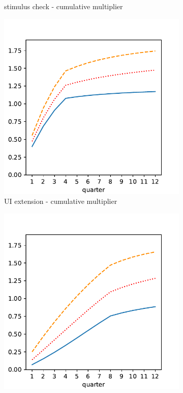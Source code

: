 \begin{figure}[htb]
\begin{subfigure}[b]{.33\linewidth}
		\caption{stimulus check - cumulative multiplier}
		\label{fig:HANK_transfer_multiplier}
	\end{subfigure}%
	\begin{subfigure}[b]{.33\linewidth}
		\centering
		\includegraphics[width=\linewidth]{text/chapter3/Code/HA-Models/FromPandemicCode/Figures/HANK_UI_multiplier}
		\caption{UI extension - cumulative multiplier}
		\label{fig:HANK_UI_multiplier}
	\end{subfigure}%
	\begin{subfigure}[b]{.33\linewidth}
		\centering
		\includegraphics[width=\linewidth]{text/chapter3/Code/HA-Models/FromPandemicCode/Figures/HANK_tax_multiplier}

\end{subfigure}
\end{figure}
